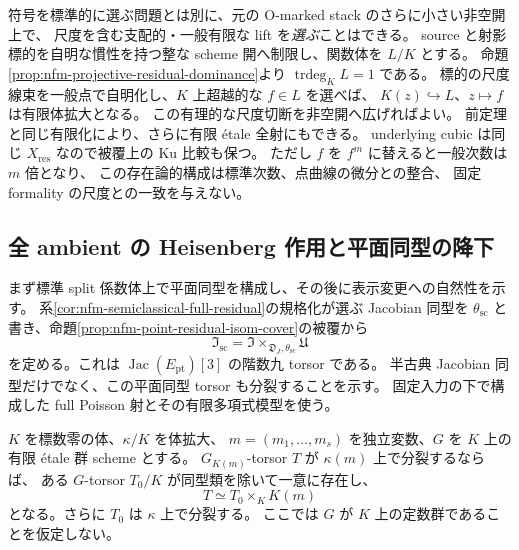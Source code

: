 \begin{remark}
\label{rem:nfm-existential-full-residual-map}
符号を標準的に選ぶ問題とは別に、元の O-marked stack のさらに小さい非空開上で、
尺度を含む支配的・一般有限な lift を\emph{選ぶ}ことはできる。
source と射影標的を自明な慣性を持つ整な scheme 開へ制限し、関数体を $L/K$ とする。
命題\ref{prop:nfm-projective-residual-dominance}より
$\operatorname{trdeg}_K L=1$ である。
標的の尺度線束を一般点で自明化し、$K$ 上超越的な $f\in L$ を選べば、
$K(z)\hookrightarrow L$、$z\mapsto f$ は有限体拡大となる。
この有理的な尺度切断を非空開へ広げればよい。
前定理と同じ有限化により、さらに有限 étale 全射にもできる。
underlying cubic は同じ $X_{\mathrm{res}}$ なので被覆上の Ku 比較も保つ。
ただし $f$ を $f^m$ に替えると一般次数は $m$ 倍となり、
この存在論的構成は標準次数、点曲線の微分との整合、
固定 formality の尺度との一致を与えない。
\end{remark}

\subsection{全 ambient の Heisenberg 作用と平面同型の降下}

まず標準 split 係数体上で平面同型を構成し、その後に表示変更への自然性を示す。
系\ref{cor:nfm-semiclassical-full-residual}の規格化が選ぶ Jacobian 同型を
$\theta_{\mathrm{sc}}$ と書き、命題\ref{prop:nfm-point-residual-isom-cover}の被覆から
\[
 \mathfrak I_{\mathrm{sc}}
   =\mathfrak I\mathbin{\times}_{\mathfrak D_J,\theta_{\mathrm{sc}}}\mathfrak U
\]
を定める。これは $\operatorname{Jac}(E_{\mathrm{pt}})[3]$ の階数九 torsor である。
半古典 Jacobian 同型だけでなく、この平面同型 torsor も分裂することを示す。
固定入力の下で構成した full Poisson 射とその有限多項式模型を使う。

\begin{lemma}
\label{lem:nfm-finite-etale-constant-descent}
$K$ を標数零の体、$\kappa/K$ を体拡大、
$m=(m_1,\ldots,m_s)$ を独立変数、$G$ を $K$ 上の有限 \'etale 群 scheme とする。
$G_{K(m)}$-torsor $T$ が $\kappa(m)$ 上で分裂するならば、
ある $G$-torsor $T_0/K$ が同型類を除いて一意に存在し、
\[
 T\simeq T_0\times_K K(m)
\]
となる。さらに $T_0$ は $\kappa$ 上で分裂する。
ここでは $G$ が $K$ 上の定数群であることを仮定しない。
\end{lemma}

